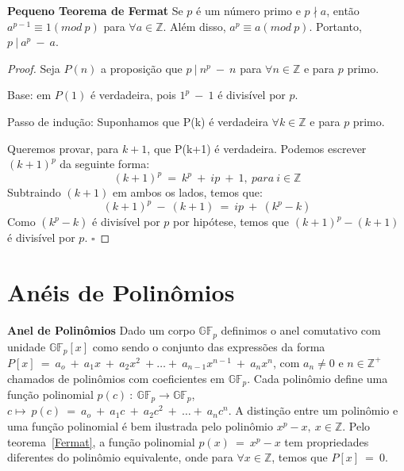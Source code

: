 
\begin{theorem} {\bf Pequeno Teorema de Fermat} \label{Fermat} 
Se $p$ é um número primo e $p \nmid a$, então $a^{p-1} \equiv 1(mod\ p)$ para $\forall a \in \mathbb{Z}$. Além disso, $a^p \equiv a(mod\ p)$.
Portanto, $p\ |\ a^p\ -\ a$. \cite{Rosen:2003}
\end{theorem}

\begin{proof} Seja $P(n)$ a proposição que $p\ |\ n^p\ -\ n$ para $\forall n \in \mathbb{Z}$ e para $p$ primo.

Base: em $P(1)$ é verdadeira, pois $1^p\ -\ 1$ é divisível por $p$.

Passo de indução: Suponhamos que P(k) é verdadeira $\forall k \in \mathbb{Z}$ e para $p$ primo.

Queremos provar, para $k+1$, que P(k+1) é verdadeira. Podemos escrever $(k+1)^p$ da seguinte forma:
$$
(k+1)^p\ =\ k^p\ +\ ip\ +\ 1,\ para\ i \in \mathbb{Z}
$$
Subtraindo $(k+1)$ em ambos os lados, temos que:
$$
(k+1)^p\ -\ (k+1)\ =\ ip\ +\ (k^p-k)
$$
Como $(k^p-k)$ é divisível por $p$ por hipótese, temos que $(k+1)^p - (k+1)$ é divisível por $p$.
$\square$
\end{proof}

\section{Anéis de Polinômios}

\begin{definition} {\bf Anel de Polinômios} \label{AnelPol}  Dado um corpo $\mathbb{GF}_p$ definimos o anel comutativo com unidade $\mathbb{GF}_p[x]$ como sendo o conjunto das expressões da forma $P[x]\ =\ a_o\ +\ a_1x\ +\ a_2x^2\ + \ldots +\ a_{n-1}x^{n-1}\ +\ a_nx^n$, com $a_n \neq 0$ e $n \in \mathbb{Z}^+$ chamados de polinômios com coeficientes em $\mathbb{GF}_p$. Cada polinômio define uma função polinomial $p(c)\ :\ \mathbb{GF}_p \rightarrow \mathbb{GF}_p$, $c \longmapsto\ p(c)\ =\ a_o\ +\ a_1c\ +\ a_2c^2\ +\ \ldots +\ a_nc^n$. A distinção entre um polinômio e uma função polinomial é bem ilustrada pelo polinômio $x^p-x,\ x \in \mathbb{Z}$. Pelo teorema~\ref{Fermat}, a função polinomial $p(x)\ =\ x^p-x$ tem propriedades diferentes do polinômio equivalente, onde para $\forall x \in \mathbb{Z}$, temos que $P[x]\ =\ 0$.
\end{definition}

